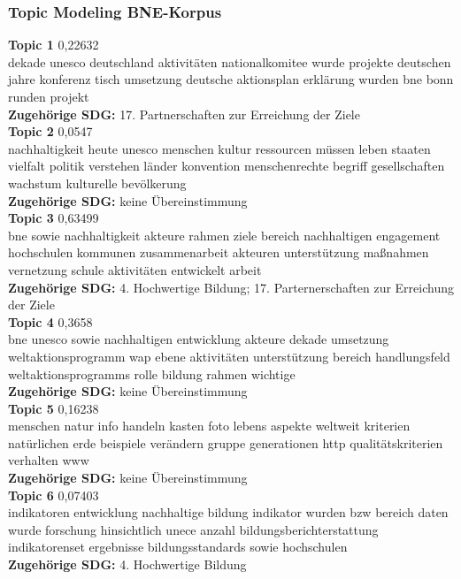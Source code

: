 \documentclass[letterpaper]{article}
\begin{document}
\subsubsection{Topic Modeling BNE-Korpus}

    \textbf{Topic 1} 0,22632\\
dekade unesco deutschland aktivitäten nationalkomitee wurde projekte deutschen jahre konferenz tisch umsetzung deutsche aktionsplan erklärung wurden bne bonn runden projekt  \\
\textbf{Zugehörige SDG:} 17. Partnerschaften zur Erreichung der Ziele \\

\textbf{Topic 2} 0,0547\\
nachhaltigkeit heute unesco menschen kultur ressourcen müssen leben staaten vielfalt politik verstehen länder konvention menschenrechte begriff gesellschaften wachstum kulturelle bevölkerung   \\
\textbf{Zugehörige SDG:} keine Übereinstimmung \\

\textbf{Topic 3} 0,63499 \\
bne sowie nachhaltigkeit akteure rahmen ziele bereich nachhaltigen engagement hochschulen kommunen zusammenarbeit akteuren unterstützung maßnahmen vernetzung schule aktivitäten entwickelt arbeit   \\
\textbf{Zugehörige SDG:} 4. Hochwertige Bildung; 17. Parternerschaften zur Erreichung der Ziele\\

\textbf{Topic 4} 0,3658 \\
bne unesco sowie nachhaltigen entwicklung akteure dekade umsetzung weltaktionsprogramm wap ebene aktivitäten unterstützung bereich handlungsfeld weltaktionsprogramms rolle bildung rahmen wichtige    \\
\textbf{Zugehörige SDG:} keine Übereinstimmung\\
  
\textbf{Topic 5} 0,16238 \\
menschen natur info handeln kasten foto lebens aspekte weltweit kriterien natürlichen erde beispiele verändern gruppe generationen http qualitätskriterien verhalten www   \\
\textbf{Zugehörige SDG:} keine Übereinstimmung\\
    
\textbf{Topic 6} 0,07403 \\
indikatoren entwicklung nachhaltige bildung indikator wurden bzw bereich daten wurde forschung hinsichtlich unece anzahl bildungsberichterstattung indikatorenset ergebnisse bildungsstandards sowie hochschulen   \\
 \textbf{Zugehörige SDG:} 4. Hochwertige Bildung \\
 
\end{document}
